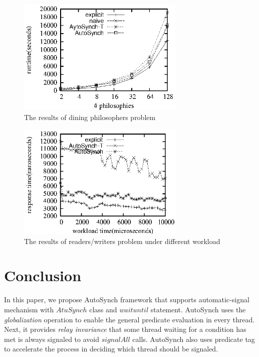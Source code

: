 \documentclass[preprint]{sigplanconf}
\begin{document}
\begin{figure}[ht!]
  \centering
  \includegraphics[width=80mm]{fig/dp.eps}
  \caption{The results of dining philosophers problem}
  \label{fig:sb_eval}
\end{figure}


\begin{figure}[ht!]
  \centering
  \includegraphics[width=80mm]{fig/strw.eps}
  \caption{The results of readers/writers problem under different workload}
  \label{fig:srw_eval}
\end{figure}







\section{Conclusion} \label{sec:conclu}
In this paper, we propose AutoSynch framework that supports 
automatic-signal mechanism with $AtuSynch$ class and $waituntil$ statement.
AutoSynch uses the {\em globalization} operation to enable the general predicate 
evaluation in every thread. Next, it provides {\em relay invariance} that some
thread waiting for a condition has met is always signaled to avoid $signalAll$
calls. AutoSynch also uses predicate tag to accelerate the process in deciding
which thread should be signaled. 
\end{document}
